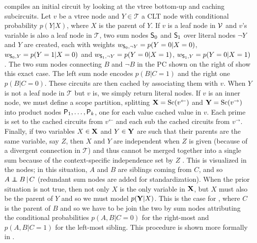  compiles an initial circuit by looking at the vtree bottom-up and caching
subcircuits. Let $v$ be a vtree
node and $Y\in\mathcal{T}$ a CLT node with conditional probability $p(Y|X)$, where $X$ is the
parent of $Y$. If $v$ is a leaf node in $\operatorname{\mathcal{V}}$ and $v$'s variable is also a leaf node in
$\mathcal{T}$, two sum nodes $\operatorname{\textup{\textsf{S}}}_0$ and $\operatorname{\textup{\textsf{S}}}_1$ over literal nodes $\neg Y$ and $Y$ are created,
each with weights $w_{\operatorname{\textup{\textsf{S}}}_0,\neg Y}=p(Y=0|X=0)$, $w_{\operatorname{\textup{\textsf{S}}}_0,Y}=p(Y=1|X=0)$ and $w_{\operatorname{\textup{\textsf{S}}}_1,\neg
Y}=p(Y=0|X=1)$, $w_{\operatorname{\textup{\textsf{S}}}_1,Y}=p(Y=0|X=1)$. The two sum nodes connecting $B$ and $\neg B$ in the PC
shown on the right of  show this exact case. The left sum node encodes $p(B|C=1)$
and the right one $p(B|C=0)$. These circuits are then cached by associating them with $v$. When $Y$
is not a leaf node in $\mathcal{T}$ but $v$ is, we simply return literal nodes. If $v$ is an inner
node, we must define a scope partition, splitting $\mathbf{X}=\operatorname*{\normalfont{Sc}}(v^\gets)$ and
$\mathbf{Y}=\operatorname*{\normalfont{Sc}}(v^\to)$ into product nodes $\operatorname{\textup{\textsf{P}}}_1,\ldots,\operatorname{\textup{\textsf{P}}}_k$, one for each value cached value
in $v$. Each prime is set to the cached circuits from $v^\gets$ and each sub the cached circuits
from $v^\to$. Finally, if two variables $X\in\mathbf{X}$ and $Y\in\mathbf{Y}$ are such that their parents
are the same variable, say $Z$, then $X$ and $Y$ are independent when $Z$ is given (because of a
divergent connection in $\mathcal{T}$) and thus cannot be merged together into a single sum because
of the context-specific independence set by $Z$ \citep{boutilier96}. This is visualized in the
\inode[fill=boxpink!50]{\newProdNode} nodes; in this situation, $A$ and $B$ are siblings coming
from $C$, and so $A\indep B\,|\,C$ (redundant sum nodes are added for standardization).
When the prior situation is not true, then not only $X$ is the only variable in $\mathbf{X}$, but $X$
must also be the parent of $Y$ and so we must model $p(\mathbf{Y}|X)$. This is the case for
\inode[fill=boxblue!50]{\newProdNode}, where $C$ is the parent of $B$ and so we have to be join the
two by sum nodes attributing the conditional probabilities $p(A,B|C=0)$ for the right-most
\inode[fill=boxblue!50]{\newProdNode} and $p(A,B|C=1)$ for the left-most sibling. This procedure is
shown more formally in .


